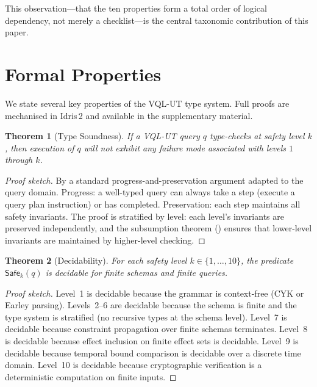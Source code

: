 \documentclass[11pt,a4paper]{article}
\newtheorem{theorem}{Theorem}[section]
\newcommand{\VQL}{\textsc{VQL-UT}}
\newcommand{\Safe}[1]{\ensuremath{\mathsf{Safe}_{#1}}}
\begin{document}
This observation---that the ten properties form a total order of
logical dependency, not merely a checklist---is the central
taxonomic contribution of this paper.

\section{Formal Properties}\label{sec:formal}

We state several key properties of the \VQL{} type system.  Full
proofs are mechanised in Idris\,2 and available in the supplementary
material.

\begin{theorem}[Type Soundness]
If a \VQL{} query $q$ type-checks at safety level $k$, then
execution of $q$ will not exhibit any failure mode associated with
levels $1$ through $k$.
\end{theorem}

\begin{proof}[Proof sketch]
By a standard progress-and-preservation argument adapted to the query
domain.  Progress: a well-typed query can always take a step (execute
a query plan instruction) or has completed.  Preservation: each step
maintains all safety invariants.  The proof is stratified by level:
each level's invariants are preserved independently, and the
subsumption theorem () ensures that lower-level
invariants are maintained by higher-level checking.
\end{proof}

\begin{theorem}[Decidability]
For each safety level $k \in \{1, \ldots, 10\}$, the predicate
$\Safe{k}(q)$ is decidable for finite schemas and finite queries.
\end{theorem}

\begin{proof}[Proof sketch]
Level~1 is decidable because the grammar is context-free (CYK or
Earley parsing).  Levels~2--6 are decidable because the schema is
finite and the type system is stratified (no recursive types at the
schema level).  Level~7 is decidable because constraint propagation
over finite schemas terminates.  Level~8 is decidable because effect
inclusion on finite effect sets is decidable.  Level~9 is decidable
because temporal bound comparison is decidable over a discrete time
domain.  Level~10 is decidable because cryptographic verification
is a deterministic computation on finite inputs.
\end{proof}
\end{document}

